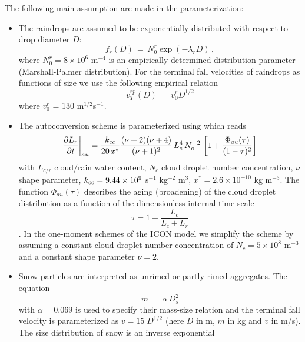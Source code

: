The following main assumption are made in the parameterization:
\begin{itemize}
\item The raindrops are assumed to be exponentially distributed with respect
  to drop diameter $D$:
  \begin{equation}
    f_r(D)\, = \,N^r_0 \exp ( - \lambda_r D ) \,,\label{7.3-2}
  \end{equation}
  where $N^r_0 = 8\times 10^6$ m$^{-4}$ is an empirically determined
  distribution parameter (Marshall-Palmer distribution). For the terminal fall
  velocities of raindrops as functions of size we use the following empirical
  relation
  \begin{equation}
    v^{rp}_T(D) \,=\, v^r_0 D^{1/2}
  \end{equation}
  where $v^r_0$ = 130 m$^{1/2}$s$^{-1}$.
\item The autoconversion scheme is parameterized using \citet{Seifert-Beheng-2001} which reads
  \begin{equation}
    \frac{\partial L_r}{\partial t} \biggr |_{au}
    =  \frac{k_{cc}}{20 \, x^*}
    \frac{(\nu+2)(\nu+4)}{(\nu+1)^2} \, 
    L_c^4 \, N_c^{-2} \,
    \left [ 1 + \frac{\Phi_{au}(\tau)}{(1-\tau)^2} \right ]
  \end{equation}
  with $L_{c/r}$ cloud/rain water content, $N_c$ cloud droplet number
  concentration, $\nu$ shape parameter, $k_{cc}=9.44 \times 10^9$ s$^{-1}$
  kg$^{-2}$ m$^{3}$, $x^*=2.6\times 10^{-10}$ kg m$^{-3}$.  The function
  $\Phi_{au}(\tau)$ describes the aging (broadening) of the cloud droplet
  distribution as a function of the dimensionless internal time scale
  \begin{equation*}
    \tau = 1 - \frac{L_c}{L_c + L_r}
  \end{equation*}
  \citep[for details see][]{Seifert-Beheng-2001}. In the one-moment schemes of
  the ICON model we simplify the scheme by assuming a constant cloud droplet
  number concentration of $N_c = 5 \times 10^8$ m$^{-3}$ and a constant shape
  parameter $\nu=2$.
\item Snow particles are interpreted as unrimed or partly rimed
  aggregates. The equation
  \begin{equation}
    m \,=\, \alpha \,D_s^2 \label{7.4-4}
  \end{equation}
  with $\alpha=0.069$ is used to specify their mass-size
  relation and the terminal
  fall velocity is parameterized as $v=15 \; D^{1/2}$ (here $D$ in m, $m$ in kg
  and $v$ in m/s). The size distribution of snow is an inverse exponential
  \begin{equation*}

\end{equation*}
\end{itemize}
